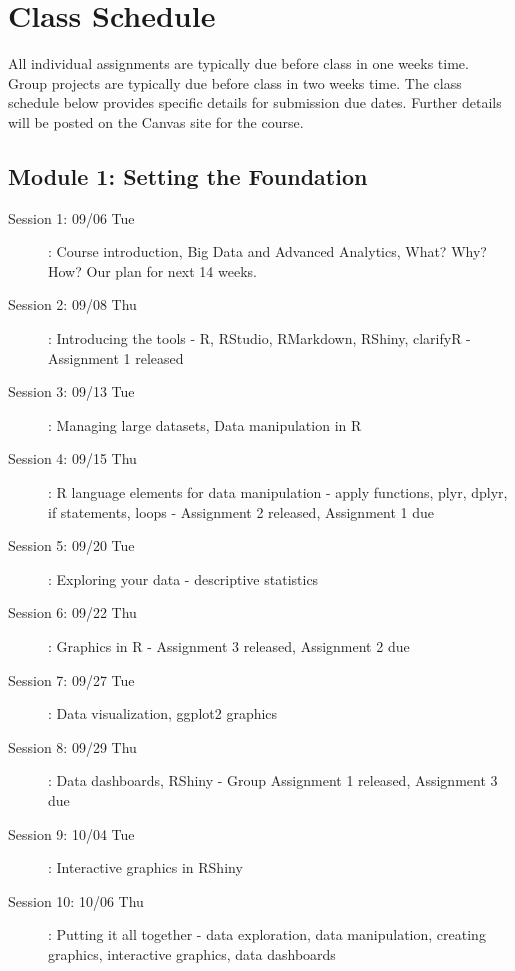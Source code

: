 \documentclass[11pt, letterpaper, twoside]{memoir}\usepackage{knitr}
\begin{document}
\section{Class Schedule}

All individual assignments are typically due before class in one weeks time. Group projects are typically due before class in two weeks time. The class schedule below provides specific details for submission due dates. Further details will be posted on the Canvas site for the course.

\subsection{Module 1: Setting the Foundation}
\begin{description}
\item [Session 1: 09/06 Tue]: Course introduction, Big Data and Advanced Analytics, What? Why? How? Our plan for next 14 weeks.

\item [Session 2: 09/08 Thu]: Introducing the tools - R, RStudio, RMarkdown, RShiny, clarifyR
    - Assignment 1 released

\item [Session 3: 09/13 Tue]: Managing large datasets, Data manipulation in R

\item [Session 4: 09/15 Thu]: R language elements for data manipulation - apply functions, plyr, dplyr, if statements, loops
    - Assignment 2 released, Assignment 1 due

\item [Session 5: 09/20 Tue]: Exploring your data - descriptive statistics
    
\item [Session 6: 09/22 Thu]: Graphics in R
    - Assignment 3 released, Assignment 2 due
    
\item [Session 7: 09/27 Tue]: Data visualization, ggplot2 graphics
    
\item [Session 8: 09/29 Thu]: Data dashboards, RShiny
    - Group Assignment 1 released, Assignment 3 due

\item [Session 9: 10/04 Tue]: Interactive graphics in RShiny

\item [Session 10: 10/06 Thu]: Putting it all together - data exploration, data manipulation, creating graphics, interactive graphics, data dashboards
\end{description}
\end{document}
